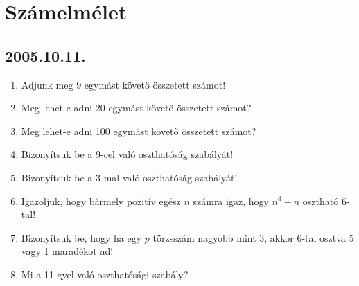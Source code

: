 \documentclass{article}
\begin{document}
\section*{Számelmélet}

\subsection*{2005.10.11.}
\begin{enumerate}
\item Adjunk meg 9 egymást követő összetett számot!

\item Meg lehet-e adni 20 egymást követő összetett számot?

\item Meg lehet-e adni 100 egymást követő összetett számot?

\item Bizonyítsuk be a 9-cel való oszthatóság szabályát!

\item Bizonyítsuk be a 3-mal való oszthatóság szabályát!

\item Igazoljuk, hogy bármely pozitív egész $n$ számra igaz, hogy $n^3-n$ osztható 6-tal!

\item Bizonyítsuk be, hogy ha egy $p$ törzsszám nagyobb mint 3, akkor 6-tal osztva 5 vagy 1 maradékot ad!

\item Mi a 11-gyel való oszthatósági szabály?

\end{enumerate}
\end{document}
